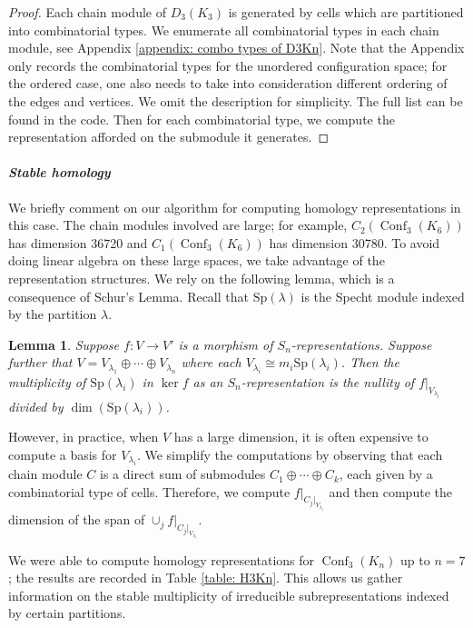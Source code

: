 \documentclass[12pt]{amsart}
\newtheorem{lem}[thm]{Lemma}
\theoremstyle{definition}
\newcommand{\conf}{\operatorname{Conf}}
\newcommand{\Sp}{\mathrm{Sp}}
\begin{document}
\begin{proof}
Each chain module of $D_3(K_3)$ is generated by cells which are partitioned into combinatorial types. We enumerate all combinatorial types in each chain module, see Appendix \ref{appendix: combo types of D3Kn}. Note that the Appendix only records the combinatorial types for the unordered configuration space; for the ordered case, one also needs to take into consideration different ordering of the edges and vertices. We omit the description for simplicity. The full list can be found in the code. Then for each combinatorial type, we compute the representation afforded on the submodule it generates.
\end{proof}

\paragraph{\textit{Stable homology}}
We briefly comment on our algorithm for computing homology representations in this case. The chain modules involved are large; for example, $C_2(\conf_3(K_6))$ has dimension 36720 and $C_1(\conf_3(K_6))$ has dimension 30780. To avoid doing linear algebra on these large spaces, we take advantage of the representation structures. We rely on the following lemma, which is a consequence of Schur's Lemma. Recall that $\Sp(\lambda)$ is the Specht module indexed by the partition $\lambda$.
\begin{lem}
    Suppose $f:V\to V'$ is a morphism of $S_n$-representations. Suppose further that $V=V_{\lambda_1}\oplus \cdots\oplus V_{\lambda_n}$ where each $V_{\lambda_i}\cong m_{i}\Sp(\lambda_i)$. Then the multiplicity of $\Sp(\lambda_i)$ in $\ker f$ as an $S_n$-representation is the nullity of $f|_{V_{\lambda_i}}$ divided by $\dim(\Sp(\lambda_i))$.
\end{lem}

However, in practice, when $V$ has a large dimension, it is often expensive to compute a basis for $V_{\lambda_i}$. We simplify the computations by observing that each chain module $C$ is a direct sum of submodules $C_1
\oplus \cdots \oplus C_k$, each given by a combinatorial type of cells. Therefore, we compute $f|_{C_j|_{V_{\lambda_i}}}$ and then compute the dimension of the span of $\cup_j f|_{C_j|_{V_{\lambda_i}}}$.

We were able to compute homology representations for $\conf_3(K_n)$ up to $n=7$; the results are recorded in Table \ref{table: H3Kn}. This allows us gather information on the stable multiplicity of irreducible subrepresentations indexed by certain partitions.
\end{document}
